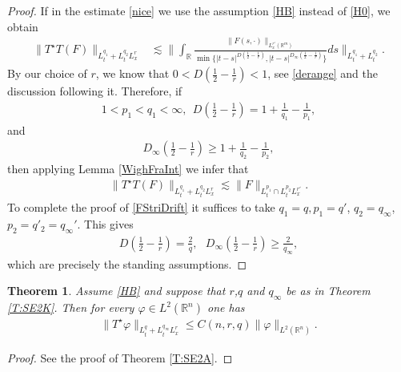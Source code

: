 \documentclass[11pt,letter]{amsart}
\def \R {\mathbb{R}}
\def \vf{\varphi}
\newcommand{\Rn}{\mathbb R^n}
\numberwithin{equation}{section}
\newtheorem{theorem}{Theorem}[section]
\numberwithin{equation}{section}
\begin{document}
\begin{proof}
If in the estimate \eqref{nice} we use the assumption \eqref{HB} instead of \eqref{H0}, we obtain
\begin{align*}
\|T^{\star}T(F)\|_{L^{q_{1}}_{t}+L^{q_{2}}_{t}L^{r}_{x}}&\lesssim \|\int_{\R}\frac{\|F(s,\cdot)\|_{L^{r'}_{x}(\mathbb{R}^{m})}}{\min\{|t-s|^{D(\frac{1}{2}-\frac{1}{r})},|t-s|^{D_{\infty}(\frac{1}{2}-\frac{1}{r})}\}}ds\|_{L^{q_{1}}_{t}+L^{q_{2}}_{t}}. 
\end{align*}
By our choice of $r$, we know that $0<D(\frac{1}{2}-\frac{1}{r})<1$, see \eqref{derange} and the discussion following it. Therefore, if
\begin{align}
1<p_{1}<q_{1}<\infty, \ \ D(\frac{1}{2}-\frac{1}{r})=1+\frac{1}{q_{1}}-\frac{1}{p_{1}},
\end{align}   
and  
\begin{align*}
D_{\infty}(\frac{1}{2}-\frac{1}{r})\ge1+\frac{1}{q_{2}}-\frac{1}{p_{2}},
\end{align*}
then applying Lemma \ref{WighFraInt} we infer that
\begin{align*}
\|T^{\star}T(F)\|_{L^{q_{1}}_{t}+L^{q_{2}}_{t}L^{r}_{x}}\lesssim \|F\|_{L^{p_{1}}_{t}\cap L^{p_{2}}_{t} L^{r'}_{x}}.
\end{align*}
To complete the proof of \eqref{FStriDrift}  it suffices to take $q_1 = q, p_1 = q'$,  $q_{2}=q_{\infty}$, $p_2 = q'_{2} = q_\infty'$. This gives
\begin{align*}
D(\frac{1}{2}-\frac{1}{r})=\frac{2}{q},\ \ \ D_{\infty}(\frac{1}{2}-\frac{1}{r})\ge\frac{2}{q_{\infty}},
\end{align*}
which are precisely the standing assumptions. 





\end{proof}

\begin{theorem}\label{T:SE2K2}
Assume \eqref{HB} and suppose that $r$,$q$ and $q_{\infty}$ be as in Theorem \ref{T:SE2K}. Then for every $\vf\in L^2(\Rn)$ one has 
\begin{align}\label{SE22K}
		\|T^{\star}\vf\|_{L^{q}_{t}+L^{q_{\infty}}_{t} L^{r}_{x}}\le C(n,r,q) \|\vf\|_{L^2(\Rn)}.
	\end{align}
\end{theorem}

\begin{proof}
See the proof of Theorem \ref{T:SE2A}.
\end{proof}
\end{document}
